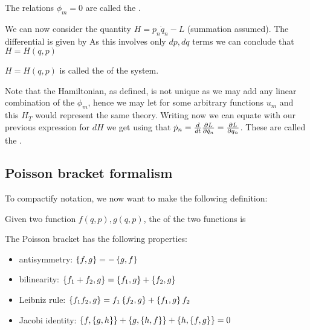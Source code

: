 \documentclass{article}
\begin{document}
\begin{definition}
The relations $\phi_m = 0$ are called the .
\end{definition}

We can now consider the quantity $H = p_n \dot{q}_n - L$ (summation assumed). The differential is given by 
As this involves only $dp,dq$ terms we can conclude that $H = H(q,p)$

\begin{definition}
$H = H(q,p)$ is called the  of the system. 
\end{definition}

Note that the Hamiltonian, as defined, is not unique as we may add any linear combination of the $\phi_m$, hence we may let 
for some arbitrary functions $u_m$ and this $H_T$ would represent the same theory. Writing now 
we can equate with our previous expression for $dH$ we get
using that $\dot{p}_n = \frac{d}{dt} \pd[L]{\dot{q}_n} = \pd[L]{q_n}$. These are called the . \\
\subsection{Poisson bracket formalism}
To compactify notation, we now want to make the following definition:

\begin{definition}
Given two function $f(q,p), g(q,p)$, the  of the two functions is 
\end{definition}

\begin{prop}
The Poisson bracket has the following properties:
\begin{itemize}
    \item antisymmetry: $\acomm[f]{g} = - \acomm[g]{f}$
    \item bilinearity: $\acomm[f_1 + f_2]{g} = \acomm[f_1]{g} + \acomm[f_2]{g}$
    \item Leibniz rule: $\acomm[f_1 f_2]{g} = f_1 \acomm[f_2]{g} + \acomm[f_1]{g} f_2$
    \item Jacobi identity: $\acomm[f]{\acomm[g]{h}}+\acomm[g]{\acomm[h]{f}}+\acomm[h]{\acomm[f]{g}} = 0$
\end{itemize}
\end{prop}
\end{document}
